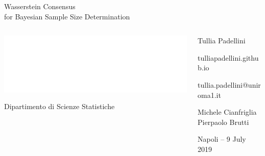 \documentclass[9 pt]{beamer}
\begin{document}
\begin{frame}




\color{white}\sffamily

\hfill \huge{Wasserstein Consensus \\ \hfill for Bayesian Sample Size Determination}
\vspace{0.6cm}


\begin{columns}

\begin{column}{0.45\textwidth}
\vspace{1.55cm}

\includegraphics[width=.7\textwidth]{sapienza-logo-png-6.png}

{\small Dipartimento di Scienze Statistiche}

\end{column}

\begin{column}{0.45\textwidth}

\hfill \Large{Tullia Padellini}

\vspace{0.25cm}


\hfill \scriptsize{tulliapadellini.github.io     \faLaptop} 

\hfill \scriptsize{tullia.padellini@uniroma1.it   \faEnvelope}

\vspace{0.5cm}
\vspace{0.3cm}

\small{\hfill \faUserPlus \; Michele Cianfriglia \\ \hfill Pierpaolo Brutti } 



\vspace{0.7cm}
\vfill
\hfill Napoli -- 9 July 2019 
\end{column}

\end{columns}


\end{frame}
\end{document}
